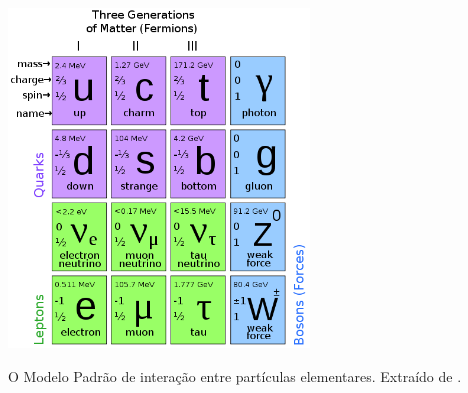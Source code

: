 \begin{table}[ht!]
\centering
\includegraphics[width=0.6\textwidth]{imagens/standart_model.png}
\caption[O Modelo Padrão de interação entre as partículas elementares]{
O Modelo Padrão de interação entre partículas elementares. Extraído de
\cite{tese_torres}.}
\label{tab:modelo_padrao}
\end{table}


